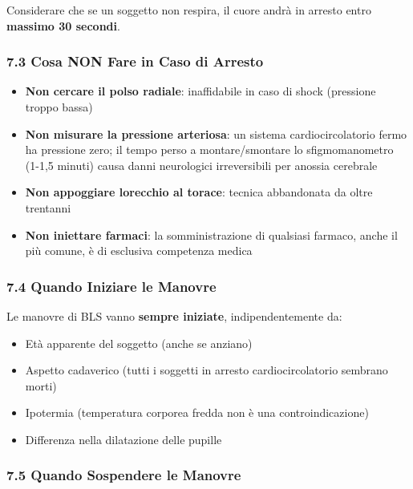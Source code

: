 \documentclass[a4paper,11pt]{article}
\providecommand{\tightlist}{%
  \setlength{\itemsep}{0pt}\setlength{\parskip}{0pt}}
\begin{document}
Considerare che se un soggetto non respira, il cuore andrà in arresto
entro \textbf{massimo 30 secondi}.

\subsubsection{7.3 Cosa NON Fare in Caso di
      Arresto}\label{cosa-non-fare-in-caso-di-arresto}

\begin{itemize}
      \tightlist
      \item
            \textbf{Non cercare il polso radiale}: inaffidabile in caso di shock
            (pressione troppo bassa)
      \item
            \textbf{Non misurare la pressione arteriosa}: un sistema
            cardiocircolatorio fermo ha pressione zero; il tempo perso a
            montare/smontare lo sfigmomanometro (1-1,5 minuti) causa danni
            neurologici irreversibili per anossia cerebrale
      \item
            \textbf{Non appoggiare l\textquotesingle orecchio al torace}: tecnica
            abbandonata da oltre trent\textquotesingle anni
      \item
            \textbf{Non iniettare farmaci}: la somministrazione di qualsiasi
            farmaco, anche il più comune, è di esclusiva competenza medica
\end{itemize}

\subsubsection{7.4 Quando Iniziare le
      Manovre}\label{quando-iniziare-le-manovre}

Le manovre di BLS vanno \textbf{sempre iniziate}, indipendentemente da:

\begin{itemize}
      \tightlist
      \item
            Età apparente del soggetto (anche se anziano)
      \item
            Aspetto cadaverico (tutti i soggetti in arresto cardiocircolatorio
            sembrano morti)
      \item
            Ipotermia (temperatura corporea fredda non è una controindicazione)
      \item
            Differenza nella dilatazione delle pupille
\end{itemize}

\subsubsection{7.5 Quando Sospendere le
      Manovre}\label{quando-sospendere-le-manovre}
\end{document}
